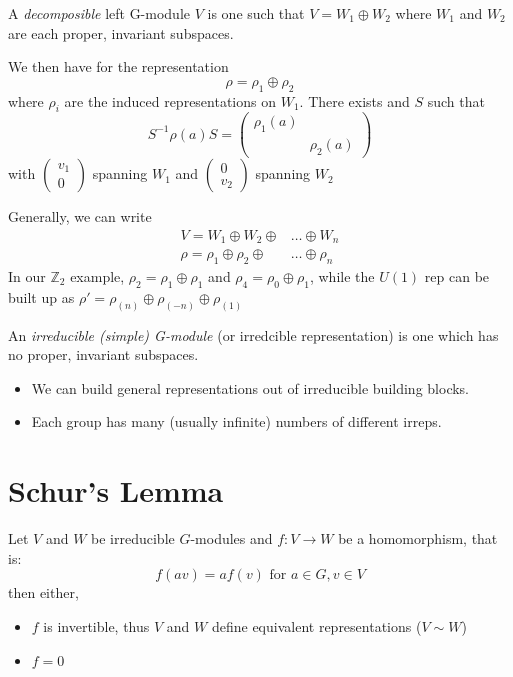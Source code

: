 \begin{enumerate}
A \textit{decomposible} left G-module $V$ is one such that $V = W_1\oplus W_2$ where $W_1$ and $W_2$ are each proper, invariant subspaces. 

We then have for the representation 
\begin{equation}
    \rho = \rho_1\oplus\rho_2
\end{equation}
where $\rho_i$ are the induced representations on $W_1$. There exists and $S$ such that 
\begin{equation}
    S^{-1}\rho(a)S = \begin{pmatrix}
        \rho_1(a) & \\
        & \rho_2(a)
    \end{pmatrix}
\end{equation}
with $\begin{pmatrix} v_1 \\ 0\end{pmatrix}$ spanning $W_1$ and $\begin{pmatrix} 0 \\ v_2\end{pmatrix}$ spanning $W_2$

Generally, we can write 
\begin{equation}
\begin{split}
    V = W_1\oplus W_2\oplus&\dots\oplus W_n\\
    \rho = \rho_1\oplus \rho_2\oplus&\dots\oplus \rho_n
\end{split}
\end{equation}
In our $\mathbb{Z}_2$ example, $\rho_2 = \rho_1\oplus\rho_1$ and $\rho_4 = \rho_0\oplus\rho_1$, while the $U(1)$ rep can be built up as $\rho' = \rho_{(n)}\oplus\rho_{(-n)}\oplus\rho_{(1)}$

An \textit{irreducible (simple) G-module} (or irredcible representation) is one which has no proper, invariant subspaces.
\begin{itemize}
    \item We can build general representations out of irreducible building blocks.
    \item Each group has many (usually infinite) numbers of different irreps. 
\end{itemize}
\section{Schur's Lemma}
Let $V$ and $W$ be irreducible $G$-modules and $f: V  \rightarrow W$ be a homomorphism, that is: 
\begin{equation}
    f(av) = af(v) \text{ for } a\in G, v\in V
\end{equation}
then either, 
\begin{itemize}
    \item $f$ is invertible, thus $V$ and $W$ define equivalent representations ($V \sim{} W$)
    \item $f=0$
\end{itemize}


\end{enumerate}
